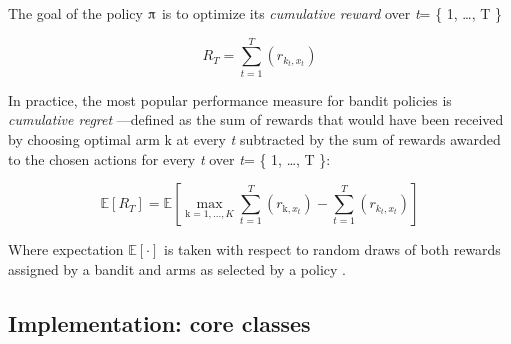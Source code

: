 \documentclass{jss}
\begin{document}
The goal of the policy $\piup$ is to optimize its \textit{cumulative reward} over \emph{t}= \{ 1, \ldots, T \}

\begin{equation} \label{eq:1}
R_{T} = \sum^{T}_{t=1}(r_{k_t,x_t})
\end{equation}

In practice, the most popular performance measure for bandit policies is \textit{cumulative regret} \citep{Kuleshov2014}---defined as the sum of rewards that would have been received by choosing optimal arm $\mathrm{k}$ at every \emph{t} subtracted by the sum of rewards awarded to the chosen actions for every \emph{t} over \emph{t}= \{ 1, \ldots, T \}:

\begin{equation} \label{eq:2}
\mathbb{E}\left[R_{T} \right] = \mathbb{E}\left[  \max_{\mathrm{k} = 1, \dots, K} \sum^{T}_{t=1}(r_{\mathrm{k},x_t}) - \sum^{T}_{t=1}(r_{k_t,x_t})\right]
\end{equation}

Where expectation $\mathbb{E}\left[ \mathord{\cdot}\right]$ is taken with respect to random draws of both rewards assigned by a bandit and arms as selected by a policy \citep{Zheng2016a}.

\subsection{Implementation: core classes} \label{implementation}
\end{document}
